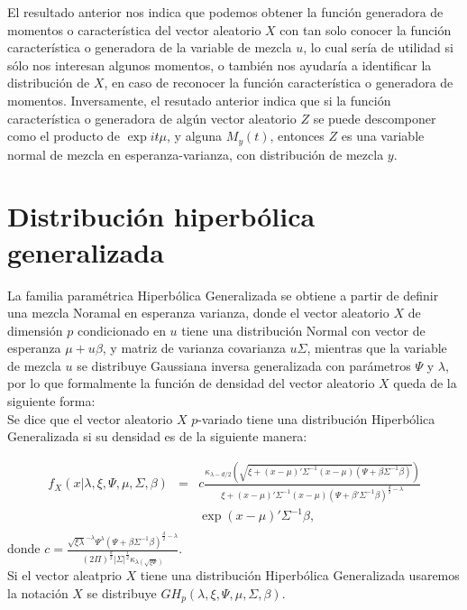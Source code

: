 El resultado anterior nos indica que podemos obtener la función generadora de momentos o característica del vector aleatorio $X$ con tan solo conocer la función característica o generadora de la variable de mezcla $u$, lo cual sería de utilidad si sólo nos interesan algunos momentos, o también nos ayudaría a identificar la distribución de $X$, en caso de reconocer la función característica o generadora de momentos. Inversamente, el resutado anterior indica que si la función característica o generadora de algún vector aleatorio $Z$ se puede descomponer como el producto de $\exp{it\acute{}\mu} $, y alguna $M_{y}(t)$, entonces $Z$ es una variable normal de mezcla en esperanza-varianza, con distribución de mezcla $y$.\\

\section{Distribución hiperbólica generalizada}
La familia paramétrica Hiperbólica Generalizada se obtiene a partir de definir una mezcla Noramal en esperanza varianza, donde el vector aleatorio $X$ de dimensión $p$ condicionado en $u$ tiene una distribución Normal con vector de esperanza $\mu +u\beta$, y matriz de varianza covarianza $u\Sigma$, mientras que la variable de mezcla $u$ se distribuye Gaussiana inversa generalizada con parámetros $\Psi$ y $\lambda$, por lo que formalmente la función de densidad del vector aleatorio $X$ queda de la siguiente forma:\\


Se dice que el vector aleatorio $X$ $p$-variado tiene una distribución Hiperbólica Generalizada  si su densidad es de la siguiente manera:

\begin{eqnarray*}
f_{X}(x|\lambda,\xi,\Psi,\mu,\Sigma,\beta)&=&c\frac{\kappa_{\lambda-d/2}(\sqrt{\xi +(x-\mu)'\Sigma^{-1}(x-\mu)(\Psi+\beta\acute{}\Sigma^{-1}\beta)})}{\xi + (x-\mu)'\Sigma^{-1}(x-\mu)(\Psi+\beta'\Sigma^{-1}\beta)^{\frac{d}{2}-\lambda}}\\
& &\exp{(x-\mu)'\Sigma^{-1}\beta},\\
\end{eqnarray*}
donde $c=\frac{\sqrt{\xi\lambda}^{-\lambda}\Psi^{\lambda}(\Psi+\beta\acute{} \Sigma^{-1}\beta)^{\frac{d}{2}-\lambda}}{(2\Pi)^{\frac{d}{2}}|\Sigma|^{\frac{1}{2}}\kappa_{\lambda(\sqrt{\xi\Psi})}}$. \\

Si el vector aleatprio $X$ tiene una distribución Hiperbólica Generalizada usaremos la notación
$X$ se distribuye $GH_{p}(\lambda,\xi,\Psi,\mu,\Sigma,\beta)$.\\

